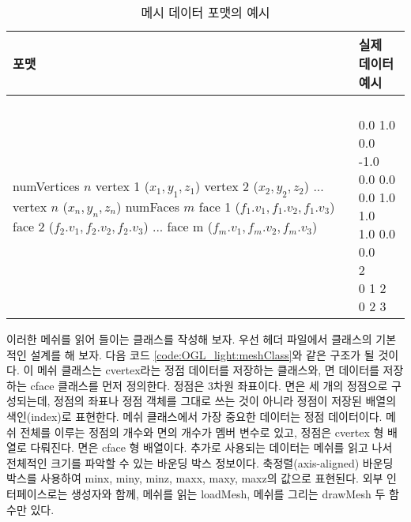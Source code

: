 \begin{table}
\caption{메시 데이터 포맷의 예시}
\label{tab:meshDataExample}
\begin{center}
    \begin{tabular}{ |l|l|}
    \hline
    {\small \sf 포맷} & {\small \sf 실제 데이터 예시} \\ \hline
\pbox{10cm}{\small \sf numVertices $n$\\ vertex 1 ($x_1,y_1,z_1$)\\ vertex 2 ($x_2,y_2,z_2$)\\ ...\\ vertex $n$ ($x_n,y_n,z_n$)\\ numFaces $m$\\ face 1 ($f_1.v_1,f_1.v_2,f_1.v_3$)\\ face 2 ($f_2.v_1,f_2.v_2,f_2.v_3$)\\ ...\\ face m ($f_m.v_1,f_m.v_2,f_m.v_3$)} & 
\pbox{10cm}{\small \sf 4\\ 0.0 1.0  0.0\\ -1.0  0.0  0.0\\  0.0  1.0  1.0\\  1.0  0.0  0.0\\ 2\\ 0 1 2\\  0 2 3 } \\ 
\hline
\end{tabular}
\end{center}
\end{table}

이러한 메쉬를 읽어 들이는 클래스를 작성해 보자. 우선 헤더 파일에서 클래스의 기본적인 설계를 해 보자. 다음 코드 \ref{code:OGL_light:meshClass}와 같은 구조가 될 것이다.
이 메쉬 클래스는 {\sf cvertex}라는 정점 데이터를 저장하는 클래스와, 면 데이터를 저장하는 {\sf cface} 클래스를 먼저 정의한다. 정점은 3차원 좌표이다. 면은 세 개의 정점으로 구성되는데, 정점의 좌표나 정점 객체를 그대로 쓰는 것이 아니라 정점이 저장된 배열의 색인(index)로 표현한다. 
메쉬 클래스에서 가장 중요한 데이터는 정점 데이터이다. 메쉬 전체를 이루는 정점의 개수와 면의 개수가 멤버 변수로 있고, 정점은 {\sf cvertex} 형 배열로 다뤄진다. 면은 {\sf cface} 형 배열이다. 추가로 사용되는 데이터는 메쉬를 읽고 나서 전체적인 크기를 파악할 수 있는 바운딩 박스 정보이다. 축정렬(axis-aligned) 바운딩 박스를 사용하여 {\sf minx, miny, minz, maxx, maxy, maxz}의 값으로 표현된다. 외부 인터페이스로는 생성자와 함께, 메쉬를 읽는 {\sf loadMesh}, 메쉬를 그리는 {\sf drawMesh} 두 함수만 있다.


